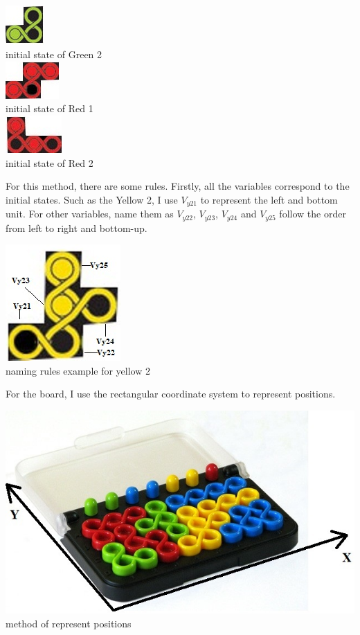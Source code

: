 \begin{center}
\\\includegraphics{figs/green2.jpg}
\\initial state of Green 2
\\\includegraphics{figs/red1.jpg}
\\initial state of Red 1 
\\\includegraphics{figs/red2.jpg}
\\initial state of Red 2 
\end{center}
For this method, there are some rules. Firstly, all the variables correspond to the initial states. Such as the Yellow 2, I use $V_{y21}$ to represent the left and bottom unit. For other variables, name them as $V_{y22}$, $V_{y23}$, $V_{y24}$ and $V_{y25}$ follow the order from left to right and bottom-up.
\begin{center}
\includegraphics{figs/example.jpg}
\\naming rules example for yellow 2
\end{center}
For the board, I use the rectangular coordinate system to represent positions. 
\begin{center}
\includegraphics{figs/IQtwistboard.jpg}
\\method of represent positions
\end{center}
